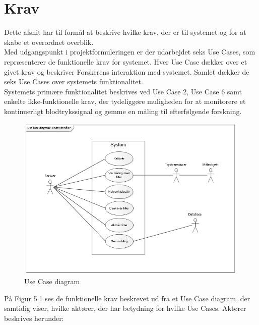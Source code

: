 \chapter{Krav}
Dette afsnit har til formål at beskrive hvilke krav, der er til systemet og for at skabe et overordnet overblik. \\
Med udgangspunkt i projektformuleringen er der udarbejdet seks Use Cases, som repræsenterer de funktionelle krav for systemet. Hver Use Case dækker over et givet krav og beskriver Forskerens interaktion med systemet. Samlet dækker de seks Use Cases over systemets funktionalitet.\\
Systemets primære funktionalitet beskrives ved Use Case 2, Use Case 6 samt enkelte ikke-funktionelle krav, der tydeliggøre muligheden for at monitorere et kontinuerligt blodtrykssignal og gemme en måling til efterfølgende forskning.

\begin{figure}[H]
	\centering
	\includegraphics[width=1\textwidth]{Figurer/1}
	\caption{Use Case diagram}
\end{figure}

På Figur 5.1 ses de funktionelle krav beskrevet ud fra et Use Case diagram, der samtidig viser, hvilke aktører, der har betydning for hvilke Use Cases.  Aktører beskrives herunder:
\\\\

